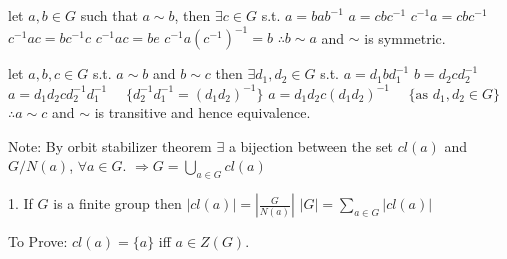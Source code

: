 let $a, b \in G$ such that $a \sim b$, then $\exists c \in G$ s.t.
$a = b a b^{-1}$ $a = c b c^{-1}$
$c^{-1} a = c b c^{-1}$
$c^{-1} a c = b c^{-1} c$
$c^{-1} a c = b e$
$c^{-1} a (c^{-1})^{-1} = b$
$\therefore b \sim a$ and $\sim$ is symmetric.

let $a, b, c \in G$ s.t. $a \sim b$ and $b \sim c$
then $\exists d_1, d_2 \in G$ s.t.
$a = d_1 b d_1^{-1}$ $b = d_2 c d_2^{-1}$
$a = d_1 d_2 c d_2^{-1} d_1^{-1}$ $\quad \{d_2^{-1} d_1^{-1} = (d_1 d_2)^{-1}\}$
$a = d_1 d_2 c (d_1 d_2)^{-1}$ $\quad \{\text{as } d_1, d_2 \in G\}$
$\therefore a \sim c$ and $\sim$ is transitive and hence equivalence.

Note: By orbit stabilizer theorem $\exists$ a bijection between the set $cl(a)$ and $G/N(a)$, $\forall a \in G$.
$\Rightarrow G = \bigcup_{a \in G} cl(a)$

1. If $G$ is a finite group then
$|cl(a)| = \left|\frac{G}{N(a)}\right|$
$|G| = \sum_{a \in G} |cl(a)|$

To Prove: $cl(a) = \{a\}$ iff $a \in Z(G)$.
